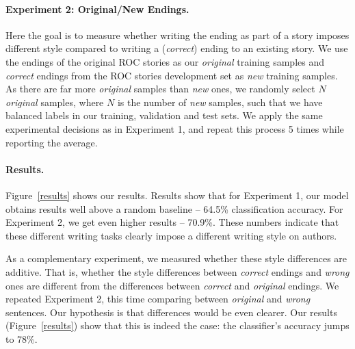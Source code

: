 \documentclass[11pt,a4paper]{article}
\newcommand{\figref}[1]{Figure~\ref{#1}}
\begin{document}
\paragraph{Experiment 2: Original/New Endings.}

Here the goal is to measure whether writing the ending as part of a story imposes different style compared to writing a ({\it correct}) ending to an existing story.
We use the endings of the original ROC stories as our {\it original} training samples and {\it correct} endings from the ROC stories development set as {\it new} training samples.
As there are far more {\it original} samples than {\it new} ones, we randomly select $N$ {\it original} samples, where $N$ is the number of {\it new} samples,
such that we have balanced labels in our training, validation and test sets.
We apply the same experimental decisions as in Experiment 1, and repeat this process 5 times while reporting the average.

\paragraph{Results.}
\figref{results} shows our results.
Results show that for Experiment 1, our model obtains results well above a random baseline -- 64.5\% classification accuracy. 
For Experiment 2, we get even higher results -- 70.9\%. 
These numbers indicate that these different writing tasks clearly impose a different writing style on authors. 

As a complementary experiment, we measured whether these style differences are additive. 
That is, whether the style differences between {\it correct} endings and {\it wrong} ones are different from the differences between {\it correct} and {\it original} endings.
We repeated Experiment 2, this time comparing between {\it original} and {\it wrong} sentences. 
Our hypothesis is that differences would be even clearer. 
Our results (\figref{results}) show that this is indeed the case: the classifier's accuracy jumps to 78\%.
\end{document}
